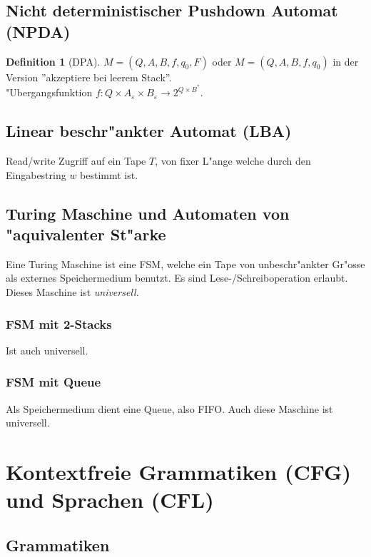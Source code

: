 \documentclass[german, 10pt, a4paper, twocolumn]{scrartcl}
\theoremstyle{definition}
\newtheorem*{definition}{Definition}
\theoremstyle{example}
\begin{document}
\subsection{Nicht deterministischer Pushdown Automat (NPDA)}
\begin{definition}[DPA]
	$M=(Q, A, B, f, q_0, F)$ oder $M=(Q, A, B, f, q_0)$ in der Version ''akzeptiere bei leerem Stack''.\\
	"Ubergangsfunktion $f: Q\times A_\varepsilon \times B_\varepsilon \rightarrow 2^{Q\times B^*}$.
\end{definition}

\subsection{Linear beschr"ankter Automat (LBA)}

Read/write Zugriff auf ein Tape $T$, von fixer L"ange welche durch den Eingabestring $w$ bestimmt ist.

\subsection{Turing Maschine und Automaten von "aquivalenter St"arke}

Eine Turing Maschine ist eine FSM, welche ein Tape von unbeschr"ankter Gr"osse als externes Speichermedium benutzt. Es sind Lese-/Schreiboperation erlaubt. Dieses Maschine ist \textit{universell}.

\subsubsection{FSM mit 2-Stacks}

Ist auch universell.

\subsubsection{FSM mit Queue}

Als Speichermedium dient eine Queue, also FIFO. Auch diese Maschine ist universell.

\section{Kontextfreie Grammatiken (CFG) und Sprachen (CFL)}

\subsection{Grammatiken}
\end{document}
